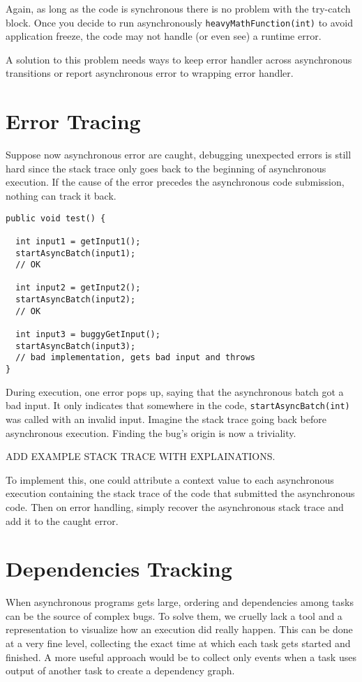 Again, as long as the code is synchronous there is no problem with the try-catch block. Once you decide to run asynchronously \lstinline{heavyMathFunction(int)} to avoid application freeze, the code may not handle (or even see) a runtime error.

A solution to this problem needs ways to keep error handler across asynchronous transitions or report asynchronous error to wrapping error handler.

\section{Error Tracing}

Suppose now asynchronous error are caught, debugging unexpected errors is still hard since the stack trace only goes back to the beginning of asynchronous execution. If the cause of the error precedes the asynchronous code submission, nothing can track it back.

\begin{lstlisting}
public void test() {

  int input1 = getInput1();
  startAsyncBatch(input1);
  // OK

  int input2 = getInput2();
  startAsyncBatch(input2);
  // OK

  int input3 = buggyGetInput();
  startAsyncBatch(input3);
  // bad implementation, gets bad input and throws
}
\end{lstlisting}

During execution, one error pops up, saying that the asynchronous batch got a bad input. It only indicates that somewhere in the code, \lstinline{startAsyncBatch(int)} was called with an invalid input. Imagine the stack trace going back before asynchronous execution. Finding the bug's origin is now a triviality. 

\dotfill ADD EXAMPLE STACK TRACE WITH EXPLAINATIONS.\dotfill

To implement this, one could attribute a context value to each asynchronous execution containing the stack trace of the code that submitted the asynchronous code. Then on error handling, simply recover the asynchronous stack trace and add it to the caught error.

\section{Dependencies Tracking}

When asynchronous programs gets large, ordering and dependencies among tasks can be the source of complex bugs. To solve them, we cruelly lack a tool and a representation to visualize how an execution did really happen. This can be done at a very fine level, collecting the exact time at which each task gets started and finished. A more useful approach would be to collect only events when a task uses output of another task to create a dependency graph.


